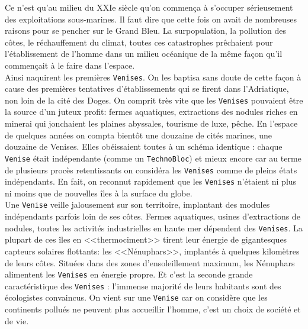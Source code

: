 \documentclass[11pt,twoside,a4paper]{article}
\begin{document}
\begin{multicols*}{2}
Ce n'est qu'au milieu du XXIe si{\`e}cle qu'on commen\c{c}a {\`a} s'occuper s{\'e}rieusement des exploitations sous-marines. Il faut dire que cette fois on avait de nombreuses raisons pour se pencher sur le Grand Bleu. La surpopulation, la pollution des c{\^o}tes, le r{\'e}chauffement du climat, toutes ces catastrophes pr{\^e}chaient pour l'{\'e}tablissement de l'homme dans un milieu oc{\'e}anique de la m{\^e}me fa\c{c}on qu'il commen\c{c}ait {\`a} le faire dans l'espace.~\\

Ainsi naquirent les premi{\`e}res \texttt{Venises}. On les baptisa sans doute de cette fa\c{c}on {\`a} cause des premi{\`e}res tentatives d'{\'e}tablissements qui se firent dans l'Adriatique, non loin de la cit{\'e} des Doges. On comprit tr{\`e}s vite que les \texttt{Venises} pouvaient {\^e}tre la source d'un juteux profit: fermes aquatiques, extractions des nodules riches en minerai qui jonchaient les plaines abyssales, tourisme de luxe, p{\^e}che. En l'espace de quelques ann{\'e}es on compta bient{\^o}t une douzaine de cit{\'e}s marines, une douzaine de Venises. Elles ob{\'e}issaient toutes {\`a} un sch{\'e}ma identique : chaque \texttt{Venise} {\'e}tait ind{\'e}pendante (comme un \texttt{TechnoBloc}) et mieux encore car au terme de plusieurs proc{\`e}s retentissants on consid{\'e}ra les \texttt{Venises} comme de pleins {\'e}tats ind{\'e}pendants. En fait, on reconnut rapidement que les \texttt{Venises} n'{\'e}taient ni plus ni moins que de nouvelles {\^i}les {\`a} la surface du globe.~\\

Une \texttt{Venise} veille jalousement sur son territoire, implantant des modules ind{\'e}pendants parfois loin de ses c{\^o}tes. Fermes aquatiques, usines d'extractions de nodules, toutes les activit{\'e}s industrielles en haute mer d{\'e}pendent des \texttt{Venises}. La plupart de ces {\^i}les en <<thermociment>> tirent leur {\'e}nergie de gigantesques capteurs solaires flottants: les <<N{\'e}nuphars>>, implant{\'e}s {\`a} quelques kilom{\`e}tres de leurs c{\^o}tes. Situ{\'e}es dans des zones d'ensoleillement maximum, les N{\'e}nuphars alimentent les \texttt{Venises} en {\'e}nergie propre. Et c'est la seconde grande caract{\'e}ristique des \texttt{Venises} : l'immense majorit{\'e} de leurs habitants sont des {\'e}cologistes convaincus. On vient sur une \texttt{Venise} car on consid{\`e}re que les continents pollu{\'e}s ne peuvent plus accueillir l'homme, c'est un choix de soci{\'e}t{\'e} et de vie.~\\


\end{multicols*}
\end{document}
